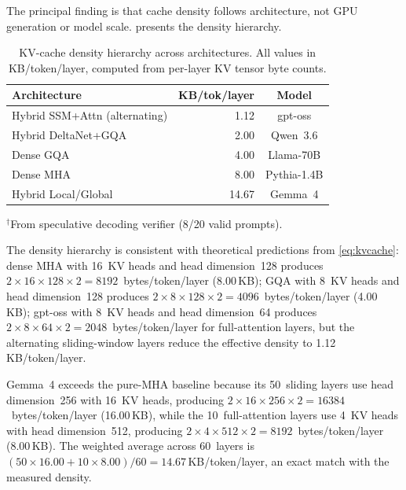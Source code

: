 \documentclass[11pt,a4paper]{article}
\begin{document}
The principal finding is that cache density follows architecture,
not GPU generation or model scale.
 presents the density hierarchy.

\begin{table}[t]
  \centering
  \small
  \caption{KV-cache density hierarchy across architectures.
    All values in KB/token/layer, computed from per-layer
    KV tensor byte counts.}
  \label{tab:density-hierarchy}
  \begin{tabular}{@{}lrc@{}}
    \toprule
    \textbf{Architecture} & \textbf{KB/tok/layer} & \textbf{Model} \\
    \midrule
    Hybrid SSM+Attn (alternating) & 1.12 & gpt-oss \\
    Hybrid DeltaNet+GQA           & 2.00 & Qwen~3.6 \\
    Dense GQA                     & 4.00 & Llama-70B\rlap{$^\dagger$} \\
    Dense MHA                     & 8.00 & Pythia-1.4B \\
    Hybrid Local/Global           & 14.67 & Gemma~4 \\
    \bottomrule
  \end{tabular}
  \vspace{2pt}
  {\footnotesize $^\dagger$From speculative decoding verifier
  (8/20 valid prompts).}
\end{table}

The density hierarchy is consistent with theoretical predictions
from \cref{eq:kvcache}:
dense MHA with 16~KV heads and head dimension~128 produces
$2 \times 16 \times 128 \times 2 = 8192$~bytes/token/layer
(8.00\,KB);
GQA with 8~KV heads and head dimension~128 produces
$2 \times 8 \times 128 \times 2 = 4096$~bytes/token/layer
(4.00\,KB);
gpt-oss with 8~KV heads and head dimension~64 produces
$2 \times 8 \times 64 \times 2 = 2048$~bytes/token/layer
for full-attention layers, but the alternating sliding-window
layers reduce the effective density to 1.12\,KB/token/layer.

Gemma~4 exceeds the pure-MHA baseline because its 50~sliding
layers use head dimension~256 with 16~KV heads, producing
$2 \times 16 \times 256 \times 2 = 16384$~bytes/token/layer
(16.00\,KB), while the 10~full-attention layers use 4~KV heads
with head dimension~512, producing
$2 \times 4 \times 512 \times 2 = 8192$~bytes/token/layer
(8.00\,KB).
The weighted average across 60~layers is
$(50 \times 16.00 + 10 \times 8.00)/60 = 14.67$\,KB/token/layer,
an exact match with the measured density.
\end{document}
